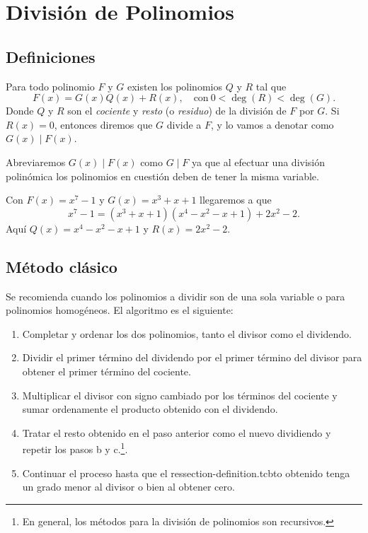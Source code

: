 \newpage
\section{División de Polinomios}


\subsection{Definiciones}

\begin{section-definition.tcb}\label{division-with-remainder}
    Para todo polinomio $F$ y $G$ existen los polinomios $Q$ y $R$ tal que
    \[F(x) = G(x)Q(x) + R(x), \quad\text{con}\ 0 < \deg{(R)} < \deg{(G)}.\]
    Donde $Q$ y $R$ son el \emph{cociente} y \emph{resto} (o \emph{residuo}) de la división de $F$ por $G$.
    Si $R(x) = 0$, entonces diremos que $G$ divide a $F$, y lo vamos a denotar como $G(x) \mid F(x)$.
\end{section-definition.tcb}

Abreviaremos $G(x) \mid F(x)$ como $G \mid F$ ya que al efectuar una división polinómica los polinomios en cuestión deben de tener la misma variable.

\begin{example}
    Con $F(x) = x^7 - 1$ y $G(x) = x^3 + x + 1$ llegaremos a que
    \[x^7 - 1 = (x^3 + x + 1)(x^4 - x^2 - x + 1) + 2 x^2 - 2.\]
    Aquí $Q(x) = x^4 - x^2 - x + 1$ y $R(x) = 2 x^2 - 2$.
\end{example}



\subsection{Método clásico}

Se recomienda cuando los polinomios a dividir son de una sola variable o para polinomios homogéneos.
El algoritmo es el siguiente:

\begin{enumerate}
    \item Completar y ordenar los dos polinomios, tanto el divisor como el dividendo.
    \item Dividir el primer término del dividendo por el primer término del divisor para obtener el primer término del cociente.
    \item Multiplicar el divisor con signo cambiado por los términos del cociente y sumar ordenamente el producto obtenido con el dividendo.
    \item Tratar el resto obtenido en el paso anterior como el nuevo dividiendo y repetir los pasos b y c.\footnote{En general, los métodos para la división de polinomios son recursivos.}.
    \item Continuar el proceso hasta que el ressection-definition.tcbto obtenido tenga un grado menor al divisor o bien al obtener cero.
\end{enumerate}



